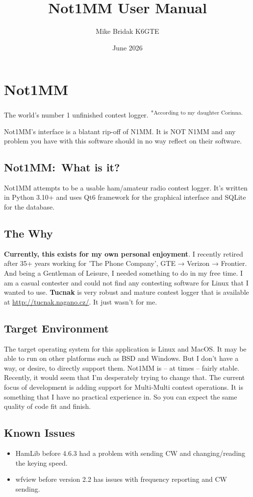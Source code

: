 \documentclass{article}
\title{Not1MM User Manual}
\author{Mike Bridak K6GTE}
\date{June 2026}
\begin{document}
\maketitle
\thispagestyle{empty}
\pagestyle{empty}
\newpage
\tableofcontents
\newpage
\pagestyle{plain}
\setcounter{page}{1}
\section{Not1MM}
The world's number 1 unfinished contest logger. \textsuperscript{*According to my daughter Corinna.}

\vspace{0.5cm}
Not1MM's interface is a blatant rip-off of N1MM. It is NOT N1MM and any problem you have with this software should in no way reflect on their software.
\subsection{Not1MM:~What is it?}
Not1MM attempts to be a usable ham/amateur radio contest logger. It's written in Python 3.10+ and uses Qt6 framework for the graphical interface and SQLite for the database.
\subsection{The Why}
\textbf{Currently, this exists for my own personal enjoyment}. I recently retired after 35+ years working for 'The Phone Company', GTE → Verizon → Frontier. And being a Gentleman of Leisure, I needed something to do in my free time. I am a casual contester and could not find any contesting software for Linux that I wanted to use. \textbf{Tucnak} is very robust and mature contest logger that is available at \url{http://tucnak.nagano.cz/}. It just wasn't for me.
\subsection{Target Environment}
The target operating system for this application is Linux and MacOS. It may be able to run on other platforms such as BSD and Windows. But I don't have a way, or desire, to directly support them. 
Not1MM is -- at times -- fairly stable. Recently, it would seem that I'm desperately trying to change that. The current focus of development is adding support for Multi-Multi contest operations. It is something that I have no practical experience in. So you can expect the same quality of code fit and finish.
\subsection{Known Issues}
\begin{itemize}
    \item {}HamLib before 4.6.3 had a problem with sending CW and changing/reading the keying speed.
    \item wfview before version 2.2 has issues with frequency reporting and CW sending.
\end{itemize}
\newpage
\end{document}
